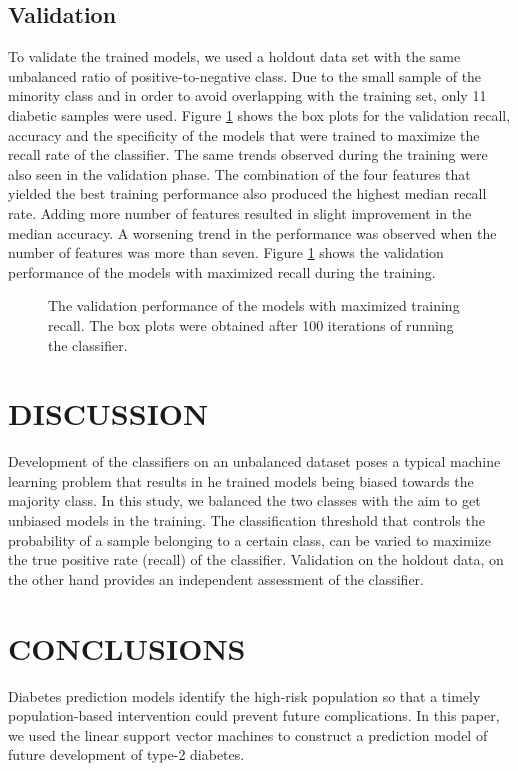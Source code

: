 \documentclass[a4paper,twoside]{article}
\begin{document}
\subsection{Validation}
% 
To validate the trained models, we used a holdout data set with the same unbalanced ratio of positive-to-negative class. Due to the small sample of the minority class and in order to avoid overlapping with the training set, only \num{11} diabetic samples were used. Figure \ref{fig:perf_validation} shows the box plots for the validation recall, accuracy and the specificity of the models that were trained to maximize the recall rate of the classifier. The same trends observed during the training were also seen in the validation phase. The combination of the four features that yielded the best training performance also produced the highest median recall rate. Adding more number of features resulted in slight improvement in the median accuracy. A worsening trend in the performance was observed when the number of features was more than seven. Figure \ref{fig:perf_validation} shows the validation performance of the models with maximized recall during the training.
% 
\begin{figure}[!tp]
  \centering
  \hfil
  \hfil
\caption{The validation performance of the models with maximized training recall. The box plots were obtained after 100 iterations of running the classifier.}
    \label{fig:perf_validation}
\end{figure}
% 
% 
\section{\uppercase{Discussion}}
\label{sec:discussion}
% 
\noindent Development of the classifiers on an unbalanced dataset poses a typical machine learning problem that results in he trained models being biased towards the majority class. In this study, we balanced the two classes with the aim to get unbiased models in the training. The classification threshold that controls the probability of a sample belonging to a certain class, can be varied to maximize the true positive rate (recall) of the classifier. Validation on the holdout data, on the other hand provides an independent assessment of the classifier. 
\section{\uppercase{Conclusions}}
\label{sec:conclusion}
% 
\noindent Diabetes prediction models identify the high-risk population so that a timely population-based intervention could prevent future complications. In this paper, we used the linear support vector machines to construct a prediction model of future development of type-2 diabetes. 
\end{document}
